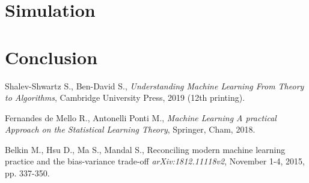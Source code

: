\documentclass[a4paper]{article}
\begin{document}
\newpage

\section{Simulation}

\newpage

\section{Conclusion}

\newpage

\begin{thebibliography}{9}
	
	Shalev-Shwartz S., Ben-David S.,
	\textit{Understanding Machine Learning From Theory to Algorithms},
	Cambridge University Press, 2019 (12th printing).
	
	Fernandes de Mello R., Antonelli Ponti M.,
	\textit{Machine Learning A practical Approach on the Statistical Learning Theory},
	Springer, Cham, 2018.
	
	Belkin M., Hsu D., Ma S., Mandal S.,
	Reconciling modern machine learning practice and the bias-variance trade-off
	\textit{arXiv:1812.11118v2}, November 1-4, 2015, pp. 337-350. 
	
	
\end{thebibliography}
\newpage

\listoffigures
\newpage
\end{document}
